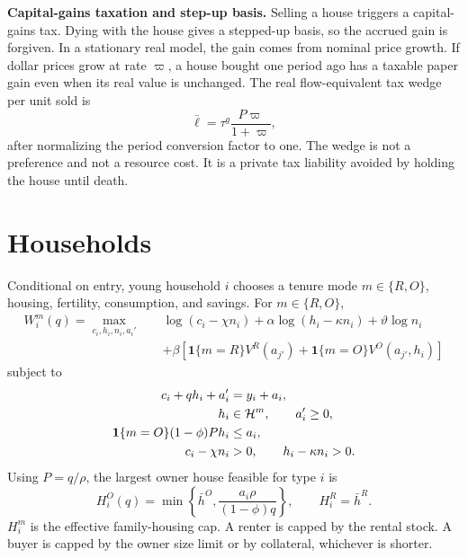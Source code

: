 \documentclass[11pt]{article}
\newcommand{\1}{\mathbf 1}
\newcommand{\HH}{\mathcal H}
\begin{document}
\textbf{Capital-gains taxation and step-up basis.} Selling a house triggers a
capital-gains tax. Dying with the house gives a stepped-up basis, so the accrued
gain is forgiven. In a stationary real model, the gain comes from nominal price
growth. If dollar prices grow at rate $\varpi$, a house bought one period ago
has a taxable paper gain even when its real value is unchanged. The real
flow-equivalent tax wedge per unit sold is
\begin{equation}
    \bar\ell=\tau^g\frac{P\varpi}{1+\varpi},
\label{eq:compact_gain_wedge}
\end{equation}
after normalizing the period conversion factor to one. The wedge is not a
preference and not a resource cost. It is a private tax liability avoided by
holding the house until death.

\section{Households}

Conditional on entry, young household $i$ chooses a tenure mode
$m\in\{R,O\}$, housing, fertility, consumption, and savings. For
$m\in\{R,O\}$,
\begin{equation}
\begin{aligned}
W_i^m(q)
=
\max_{c_i,h_i,n_i,a_i'}\quad
&\log(c_i-\chi n_i)+\alpha\log(h_i-\kappa n_i)+\vartheta\log n_i\\
&+\beta\left[
\1\{m=R\}V^R(a_{j'})
+\1\{m=O\}V^O(a_{j'},h_i)
\right]
\end{aligned}
\label{eq:compact_young_problem}
\end{equation}
subject to
\begin{align}
c_i+q h_i+a_i'&=y_i+a_i,
\label{eq:compact_young_budget}\\
h_i&\in\HH^m,\qquad a_i'\ge0,
\notag\\
\1\{m=O\}(1-\phi)Ph_i&\le a_i,
\label{eq:compact_owner_constraint}\\
c_i-\chi n_i&>0,\qquad h_i-\kappa n_i>0.
\notag
\end{align}
Using $P=q/\rho$, the largest owner house feasible for type $i$ is
\begin{equation}
H_i^O(q)=
\min\left\{
\bar h^O,\frac{a_i\rho}{(1-\phi)q}
\right\},
\qquad
H_i^R=\bar h^R.
\label{eq:compact_family_cap}
\end{equation}
$H_i^m$ is the effective family-housing cap. A renter is capped by the rental
stock. A buyer is capped by the owner size limit or by collateral, whichever is
shorter.
\end{document}

